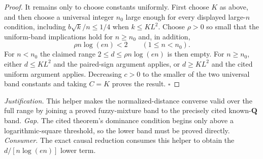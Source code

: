 \documentclass{article}
\begin{document}
\begin{proof}
It remains only to choose constants uniformly.  First choose \(K\) as above, and then choose a universal integer \(n_0\) large enough for every displayed large-\(n\) condition, including \(b\sqrt{k}/n\le1/4\) when \(k\le K L^2\).  Choose \(\rho>0\) so small that the uniform-band implications hold for \(n\ge n_0\) and, in addition,
\[
 \rho n\log(en)<2\qquad(1\le n<n_0).
\]
For \(n<n_0\) the claimed range \(2\le d\le\rho n\log(en)\) is then empty.  For \(n\ge n_0\), either \(d\le K L^2\) and the paired-sign argument applies, or \(d\ge K L^2\) and the cited uniform argument applies.  Decreasing \(c>0\) to the smaller of the two universal band constants and taking \(C=K\) proves the result. \(\square\)
\end{proof}
\par\smallskip\noindent \textit{Justification.} This helper makes the normalized-distance converse valid over the full range by joining a proved fuzzy-mixture band to the precisely cited known-\(\mathbf Q\) band. \textit{Gap.} The cited theorem's dominance condition begins only above a logarithmic-square threshold, so the lower band must be proved directly. \textit{Consumer.} The exact causal reduction consumes this helper to obtain the \(d/[n\log(en)]\) lower term.
\end{document}
